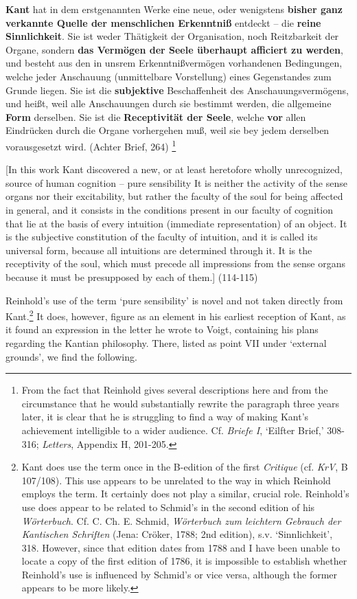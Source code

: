 \textbf{Kant }hat in dem erstgenannten Werke eine neue, oder wenigstens \textbf{bisher ganz verkannte Quelle der menschlichen Erkenntni\ss{} }entdeckt {--} die \textbf{reine Sinnlichkeit}. Sie ist weder Th\"{a}tigkeit der Organisation, noch Reitzbarkeit der Organe, sondern \textbf{das Verm\"{o}gen der Seele \"{u}berhaupt afficiert zu werden}, und besteht aus den in unsrem Erkenntni\ss{}verm\"{o}gen vorhandenen Bedingungen, welche jeder Anschauung (unmittelbare Vorstellung) eines Gegenstandes zum Grunde liegen. Sie ist die \textbf{subjektive} Beschaffenheit des Anschauungsverm\"{o}gens, und hei\ss{}t, weil alle Anschauungen durch sie bestimmt werden, die allgemeine \textbf{Form} derselben. Sie ist die \textbf{Receptivit\"{a}t der Seele}, welche \textbf{vor} allen Eindr\"{u}cken durch die Organe vorhergehen mu\ss{}, weil sie bey jedem derselben vorausgesetzt wird. (Achter Brief, 264) \footnote{ From the fact that Reinhold gives several descriptions here and from the circumstance that he would substantially rewrite the paragraph three years later, it is clear that he is struggling to find a way of making Kant's achievement intelligible to a wider audience. Cf. \textit{Briefe I}, `Eilfter Brief,' 308{-}316; \textit{Letters}, Appendix H, 201{-}205.}

[In this work Kant discovered a new, or at least heretofore wholly unrecognized, source of human cognition {--} pure sensibility It is neither the activity of the sense organs nor their excitability, but rather the faculty of the soul for being affected in general, and it consists in the conditions present in our faculty of cognition that lie at the basis of every intuition (immediate representation) of an object. It is the subjective constitution of the faculty of intuition, and it is called its universal form, because all intuitions are determined through it. It is the receptivity of the soul, which must precede all impressions from the sense organs because it must be presupposed by each of them.] (114{-}115) 

Reinhold's use of the term `pure sensibility' is novel and not taken directly from Kant.\footnote{ Kant does use the term once in the B{-}edition of the first \textit{Critique} (cf. \textit{KrV}, B 107/108). This use appears to be unrelated to the way in which Reinhold employs the term. It certainly does not play a similar, crucial role. Reinhold's use does appear to be related to Schmid's in the second edition of his \textit{W\"{o}rterbuch}. Cf. C. Ch. E. Schmid, \textit{W\"{o}rterbuch zum leichtern Gebrauch der Kantischen Schriften} (Jena: Cr\"{o}ker, 1788; 2nd edition), s.v. `Sinnlichkeit', 318. However, since that edition dates from 1788 and I have been unable to locate a copy of the first edition of 1786, it is impossible to establish whether Reinhold's use is influenced by Schmid's or vice versa, although the former appears to be more likely. } It does, however, figure as an element in his earliest reception of Kant, as it found an expression in the letter he wrote to Voigt, containing his plans regarding the Kantian philosophy. There, listed as point VII under `external grounds', we find the following. 


